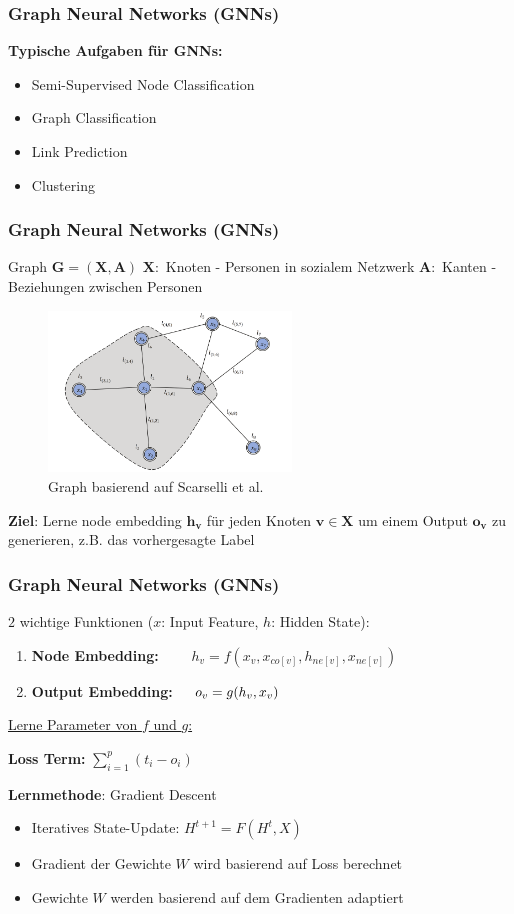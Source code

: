 \documentclass{beamer}
\begin{document}
\begin{frame}
  \frametitle{Graph Neural Networks (GNNs)}
  \textbf{Typische Aufgaben für GNNs:}
  \begin{itemize}
    \item Semi-Supervised Node Classification
    \item Graph Classification
    \item Link Prediction
    \item Clustering
  \end{itemize}
\end{frame}

\begin{frame}
  \frametitle{Graph Neural Networks (GNNs)}
  Graph $\boldsymbol{G = (X, A)}$\newline
  $\boldsymbol{X}:$ Knoten - Personen in sozialem Netzwerk\newline
  $\boldsymbol{A}:$ Kanten - Beziehungen zwischen Personen
  \begin{figure}
    \centering
    \includegraphics[width=0.575\textwidth]{img/graph.png}
    \caption*{Graph basierend auf Scarselli et al. \cite{Liu_2020}}
  \end{figure}
  \textbf{Ziel}: Lerne node embedding $\boldsymbol{h_v}$ für jeden Knoten $\boldsymbol{v} \in \boldsymbol{X}$ um 
  einem Output $\boldsymbol{o_v}$ zu generieren, z.B. das vorhergesagte Label
\end{frame}

\begin{frame}
  \frametitle{Graph Neural Networks (GNNs)}

  $2$ wichtige Funktionen ($x$: Input Feature, $h$: Hidden State):
  \begin{enumerate}
    \item \textbf{Node Embedding:} $\quad\quad h_v = f(x_v, x_{co[v]}, h_{ne[v]}, x_{ne[v]})$
    \item \textbf{Output Embedding:} $\quad\thinspace o_v = g(h_v, x_v)$
  \end{enumerate}

  \underline{Lerne Parameter von $f$ und $g$:}

  \textbf{Loss Term:} $\sum_{i=1}^p (t_i - o_i)$

  \textbf{Lernmethode}: Gradient Descent
  \begin{itemize}
    \item Iteratives State-Update: $H^{t+1} = F(H^t, X)$
    \item Gradient der Gewichte $W$ wird basierend auf Loss berechnet
    \item Gewichte $W$ werden basierend auf dem Gradienten adaptiert
  \end{itemize}
\end{frame}
\end{document}
